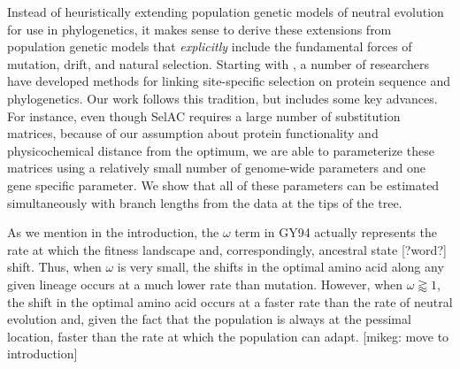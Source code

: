 \documentclass[12pt,letterpaper]{article}
\newcommand{\selac}{SelAC\xspace}
\begin{document}
Instead of heuristically extending population genetic models of neutral evolution for use in phylogenetics, it makes sense to derive these extensions from population genetic models that \emph{explicitly} include the fundamental forces of mutation, drift, and natural selection.
Starting with \citet{HalpernAndBruno1998}, a number of researchers have developed methods for linking site-specific selection on protein sequence and phylogenetics\citep[e.g.~][]{KoshiEtAl1999,DimmicEtAl2000,KoshiAndGoldstein2001,RobinsonEtAl2003,LartillotAndPhilippe2004,ThorneEtAl2012,RodrigueAndLartillot2014}.
Our work follows this tradition, but includes some key advances.
For instance, even though \selac requires a large number of substitution matrices, because of our assumption about protein functionality and physicochemical distance from the optimum, we are able to parameterize these matrices using a relatively small number of genome-wide parameters and one gene specific parameter.
We show that all of these parameters can be estimated simultaneously with branch lengths from the data at the tips of the tree.


As we mention in the introduction, the $\omega$ term in GY94 actually represents the rate at which the fitness landscape and, correspondingly, ancestral state [?word?] shift.
Thus, when $\omega$ is very small, the shifts in the optimal amino acid along any given lineage occurs at a much lower rate than mutation.
However, when $\omega \gtrapprox 1$, the shift in the optimal amino acid occurs at a faster rate than the rate of neutral evolution and, given the fact that the population is always at the pessimal location, faster than the rate at which the population can adapt.
[mikeg: move to introduction]
\end{document}
